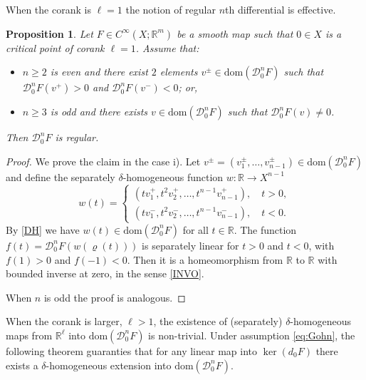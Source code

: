 \documentclass[12pt, reqno]{amsart}
\theoremstyle{plain}
\newtheorem {proposition} [theorem]{Proposition}
\theoremstyle{definition}
\theoremstyle{remark}
\numberwithin{equation}{section}
\newcommand{\R}{\mathbb{R}}
\newcommand{\0}{\theta}
\newcommand{\1}{{-1}}
\renewcommand{\l}{\ell}
\renewcommand{\=}{\coloneqq}
\renewcommand{\.}{\dots}
\newcommand{\mc}{\mathcal}
\newcommand{\dom}{\mathrm{dom}}
\begin{document}
{When the corank is $\l=1$ the notion of regular $n$th differential is effective.


\begin{proposition}
\label{REGON}
Let $ F\in C^\infty(X;\R^m)$ be a smooth map such that  
$0\in X$ is a critical point of corank $\l=1$. Assume that: 
        \begin{itemize}
		\item[i)] $n\geq 2$ is even and there exist $2$ elements $v^{\pm} \in\dom(\mc D_0 ^nF) $ such that $\mc D_0^n F(v^+)>0$ and  $\mc D_0^n F(v^-)<0$; or,
		 \item[ii)] $n\geq 3 $ is odd and there exists $v \in\dom(\mc D_0 ^nF) $ such that $\mc D_0^n F(v)\neq 0$.
		    \end{itemize} 
Then $\mc D_0^nF$ is regular. 
\end{proposition}

\begin{proof} We prove the claim in the case i). Let $v^\pm = (v_1^\pm,\ldots, v_{n-1}^\pm)\in\dom(\mc D_0 ^nF) $ and define the separately $\delta$-homogeneous  function $w:\R\to X^{n-1}$
\[
  w(t) =\left\{
  \begin{array}{l}
   (t v_1^+,t^2 v_2^+, \ldots, t^{n-1} v_{n-1}^+),\quad t>0,
   \\
   (t v_1^-,t^2 v_2^-, \ldots, t^{n-1} v_{n-1}^-),\quad t<0.
  \end{array}
  \right.
\]
By \eqref{DH} we have  $w(t) \in \dom(\mc D_0 ^nF)$ for all $t\in \R$. The function $f(t) =\mc D_0^n F(w(\varrho(t))   )$ is separately linear for $t>0$ and $t<0$, with $f(1)>0$ and $f(-1)<0$. Then it is a homeomorphism from $\R$ to $\R$ with bounded inverse at zero, in the sense \eqref{INVO}.

When $n$ is odd the proof is   analogous.


\end{proof}



 When the corank is larger, $\ell>1$, the existence of (separately) $\delta$-homogeneous maps from $\R^\ell$ into $\dom(\mc D_0^n F)$ is non-trivial.
 Under assumption \eqref{eq:Gohn},
 the following  theorem guaranties that for any linear map into  $\ker(d_0F)$
there exists a $\delta$-homogeneous  extension into $ \dom(\mc D_0^n F)$.





}
\end{document}

